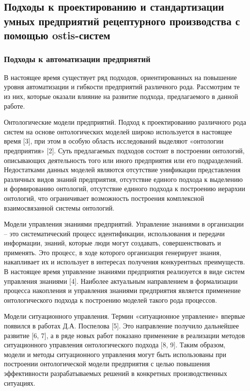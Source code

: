 \subsection{Подходы к проектированию и стандартизации умных предприятий рецептурного производства с помощью ostis-систем}


\subsubsection{Подходы к автоматизации предприятий}

В настоящее время существует ряд подходов, ориентированных на повышение уровня автоматизации и гибкости предприятий различного рода. Рассмотрим те из них, которые оказали влияние на развитие подхода, предлагаемого в данной работе.
\begin{textitemize}
    \item Онтологические модели предприятий. Подход к проектированию различного рода систем на основе онтологических моделей широко используется в настоящее время [3], при этом в особую область исследований выделяют «онтологии предприятия» [2]. Суть предлагаемых подходов состоит в построении онтологий, описывающих деятельность того или иного предприятия или его подразделений. Недостатками данных моделей являются отсутствие унификации представления различных видов знаний предприятия, отсутствие единого подхода к выделению и формированию онтологий, отсутствие единого подхода к построению иерархии онтологий, что ограничивает возможность построения комплексной взаимосвязанной системы онтологий.
    \item Модели управления знаниями предприятий. Управление знаниями в организации – это систематический процесс идентификации, использования и передачи информации, знаний, которые люди могут создавать, совершенствовать и применять. Это процесс, в ходе которого организация генерирует знания, накапливает их и использует в интересах получения конкурентных преимуществ. В настоящее время управление знаниями предприятия реализуется в виде систем управления знаниями [4]. Наиболее актуальным направлением в формализации процесса накопления и управления знаниями предприятия является применение онтологического подхода к построению моделей такого рода процессов.
    \item Модели ситуационного управления. Термин «ситуационное управление» впервые появился в работах Д.А. Поспелова [5]. Это направление получило дальнейшее развитие [6, 7], а в ряде новых работ показано применение в реализации методов ситуационного управления онтологического подхода [8, 9]. Таким образом, модели и методы ситуационного управления могут быть использованы при построении онтологической модели предприятия с целью повышения эффективности разрабатываемых решений в конкретных производственных ситуациях.

\end{textitemize}
